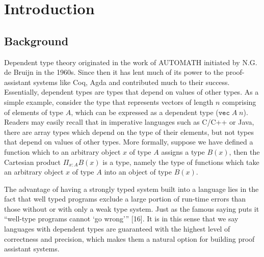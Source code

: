 \chapter{Introduction}
\section{Background}
Dependent type theory originated in the work of AUTOMATH\cite{de1994survey} initiated by N.G. de Bruijn in the 1960s. Since then it has lent much of its power to the proof-assistant systems like Coq\cite{huet1997coq}, Agda\cite{norell2008dependently} and contributed much to their success. Essentially, dependent types are types that depend on values of other types. As a simple example, consider the type that represents vectors of length $n$ comprising of elements of type $A$, which can be expressed as a dependent type ($\texttt{vec}\; A\; n$). Readers may easily recall that in imperative languages such as C/C++ or Java, there are array types which depend on the type of their elements, but not types that depend on values of other types. More formally, suppose we have defined a function which to an arbitrary object $x$ of type $A$ assigns a type $B(x)$, then the Cartesian product $\Pi_{x:A}B(x)$ is a type, namely the type of functions which take an arbitrary object $x$ of type $A$ into an object of type $B(x)$.

The advantage of having a strongly typed system built into a language lies in the fact that well typed programs exclude a large portion of run-time errors than those without or with only a weak type system. Just as the famous saying puts it “well-type programs cannot ‘go wrong’” [16]. It is in this sense that we say languages with dependent types are guaranteed with the highest level of correctness and precision, which makes them a natural option for building proof assistant systems.


